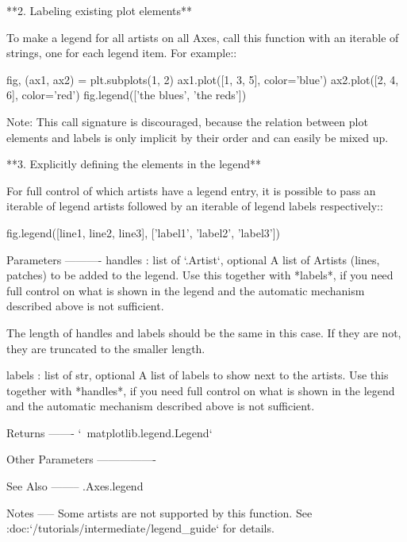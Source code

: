 \begin{DoxyVerb}
\begin{DoxyVerb}
\begin{DoxyVerb}
**2. Labeling existing plot elements**

To make a legend for all artists on all Axes, call this function with
an iterable of strings, one for each legend item. For example::

    fig, (ax1, ax2)  = plt.subplots(1, 2)
    ax1.plot([1, 3, 5], color='blue')
    ax2.plot([2, 4, 6], color='red')
    fig.legend(['the blues', 'the reds'])

Note: This call signature is discouraged, because the relation between
plot elements and labels is only implicit by their order and can
easily be mixed up.


**3. Explicitly defining the elements in the legend**

For full control of which artists have a legend entry, it is possible
to pass an iterable of legend artists followed by an iterable of
legend labels respectively::

    fig.legend([line1, line2, line3], ['label1', 'label2', 'label3'])

Parameters
----------
handles : list of `.Artist`, optional
    A list of Artists (lines, patches) to be added to the legend.
    Use this together with *labels*, if you need full control on what
    is shown in the legend and the automatic mechanism described above
    is not sufficient.

    The length of handles and labels should be the same in this
    case. If they are not, they are truncated to the smaller length.

labels : list of str, optional
    A list of labels to show next to the artists.
    Use this together with *handles*, if you need full control on what
    is shown in the legend and the automatic mechanism described above
    is not sufficient.

Returns
-------
`~matplotlib.legend.Legend`

Other Parameters
----------------

See Also
--------
.Axes.legend

Notes
-----
Some artists are not supported by this function.  See
:doc:`/tutorials/intermediate/legend_guide` for details.
\end{DoxyVerb}
 \mbox{\label{classmatplotlib_1_1figure_1_1FigureBase_a5a8e3e15ea99ca07532bffeabdd2e74a}} 

\end{DoxyVerb}
\end{DoxyVerb}
